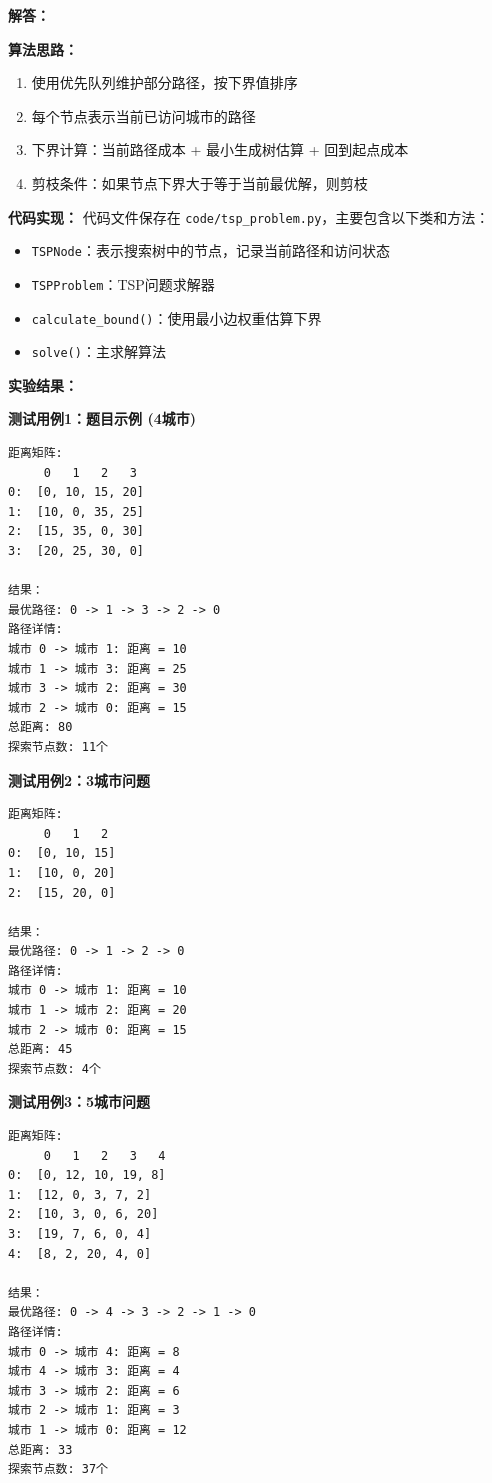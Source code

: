 \documentclass[12pt,twoside]{article}
\begin{document}
\begin{problems}
{\bf 解答：}

{\bf 算法思路：}
\begin{enumerate}
    \item 使用优先队列维护部分路径，按下界值排序
    \item 每个节点表示当前已访问城市的路径
    \item 下界计算：当前路径成本 + 最小生成树估算 + 回到起点成本
    \item 剪枝条件：如果节点下界大于等于当前最优解，则剪枝
\end{enumerate}

{\bf 代码实现：}
代码文件保存在 \texttt{code/tsp\_problem.py}，主要包含以下类和方法：
\begin{itemize}
    \item \texttt{TSPNode}：表示搜索树中的节点，记录当前路径和访问状态
    \item \texttt{TSPProblem}：TSP问题求解器
    \item \texttt{calculate\_bound()}：使用最小边权重估算下界
    \item \texttt{solve()}：主求解算法
\end{itemize}

{\bf 实验结果：}

{\bf 测试用例1：题目示例 (4城市)}
\begin{verbatim}
距离矩阵:
     0   1   2   3
0:  [0, 10, 15, 20]
1:  [10, 0, 35, 25]
2:  [15, 35, 0, 30]
3:  [20, 25, 30, 0]

结果：
最优路径: 0 -> 1 -> 3 -> 2 -> 0
路径详情:
城市 0 -> 城市 1: 距离 = 10
城市 1 -> 城市 3: 距离 = 25
城市 3 -> 城市 2: 距离 = 30
城市 2 -> 城市 0: 距离 = 15
总距离: 80
探索节点数: 11个
\end{verbatim}

{\bf 测试用例2：3城市问题}
\begin{verbatim}
距离矩阵:
     0   1   2
0:  [0, 10, 15]
1:  [10, 0, 20]
2:  [15, 20, 0]

结果：
最优路径: 0 -> 1 -> 2 -> 0
路径详情:
城市 0 -> 城市 1: 距离 = 10
城市 1 -> 城市 2: 距离 = 20
城市 2 -> 城市 0: 距离 = 15
总距离: 45
探索节点数: 4个
\end{verbatim}

{\bf 测试用例3：5城市问题}
\begin{verbatim}
距离矩阵:
     0   1   2   3   4
0:  [0, 12, 10, 19, 8]
1:  [12, 0, 3, 7, 2]
2:  [10, 3, 0, 6, 20]
3:  [19, 7, 6, 0, 4]
4:  [8, 2, 20, 4, 0]

结果：
最优路径: 0 -> 4 -> 3 -> 2 -> 1 -> 0
路径详情:
城市 0 -> 城市 4: 距离 = 8
城市 4 -> 城市 3: 距离 = 4
城市 3 -> 城市 2: 距离 = 6
城市 2 -> 城市 1: 距离 = 3
城市 1 -> 城市 0: 距离 = 12
总距离: 33
探索节点数: 37个
\end{verbatim}


\end{problems}
\end{document}

